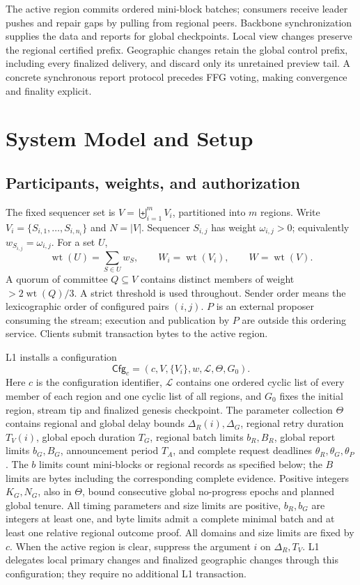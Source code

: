 \documentclass[11pt,a4paper,onecolumn]{article}
\newcommand{\Cfg}{\mathsf{Cfg}}
\newcommand{\wt}{\operatorname{wt}}
\theoremstyle{remark}\newtheorem{example}[definition]{Example}
\newcounter{protocol}
\begin{document}
The active region commits ordered mini-block batches; consumers receive leader
pushes and repair gaps by pulling from regional peers. Backbone synchronization
supplies the data and reports for global checkpoints. Local view changes preserve
the regional certified prefix. Geographic changes retain the global control
prefix, including every finalized delivery, and discard only its unretained
preview tail. A concrete synchronous report protocol precedes FFG voting,
making convergence and finality explicit.


\section{System Model and Setup}\label{sec:model}
\subsection{Participants, weights, and authorization}
The fixed sequencer set is $V=\biguplus_{i=1}^{m}V_i$, partitioned into $m$ regions.
Write $V_i=\{S_{i,1},\ldots,S_{i,n_i}\}$ and $N=|V|$. Sequencer $S_{i,j}$ has
weight $\omega_{i,j}>0$; equivalently $w_{S_{i,j}}=\omega_{i,j}$. For a set $U$,
\[
 \wt(U)=\sum_{S\in U}w_S,\qquad W_i=\wt(V_i),\qquad W=\wt(V).
\]
A quorum of committee $Q\subseteq V$ contains distinct members of weight
$>2\wt(Q)/3$. A strict threshold is used throughout. Sender order means the lexicographic
order of configured pairs $(i,j)$. $P$ is an external
proposer consuming the stream; execution and publication by $P$ are outside
this ordering service. Clients submit transaction bytes to the active region.

L1 installs a configuration
\begin{equation}\label{eq:cfg}
 \Cfg_c=(c,V,\{V_i\},w,\mathcal L,\Theta,G_0).
\end{equation}
Here $c$ is the configuration identifier, $\mathcal L$ contains one ordered
cyclic list of every member of each region and one cyclic list of all regions,
and $G_0$ fixes the initial region, stream tip and finalized genesis checkpoint.
The parameter collection $\Theta$ contains regional and global delay bounds
$\Delta_R(i),\Delta_G$, regional retry duration $T_V(i)$, global epoch duration
$T_G$, regional batch limits $b_R,B_R$, global report limits $b_G,B_G$,
announcement period $T_A$, and complete request deadlines $\theta_R,\theta_G,\theta_P$.
The $b$ limits count mini-blocks or regional records as specified below; the
$B$ limits are bytes including the corresponding complete evidence.
Positive integers $K_G,N_G$, also in $\Theta$, bound consecutive global
no-progress epochs and planned global tenure. All timing parameters and size
limits are positive, $b_R,b_G$ are integers at least one, and byte limits admit
a complete minimal batch and at least one relative regional outcome proof.
All domains and size limits are fixed by $c$.
When the active region is clear, suppress the argument $i$ on $\Delta_R,T_V$.
L1 delegates local primary changes and finalized geographic changes through
this configuration; they require no additional L1 transaction.
\end{document}
